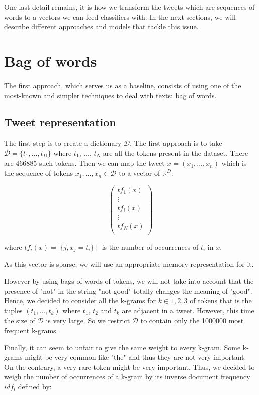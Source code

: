 \documentclass[10pt,conference,compsocconf]{IEEEtran}
\begin{document}
One last detail remains, it is how we transform the tweets which are sequences of words to a vectors we can feed classifiers with. In the next sections, we will describe different approaches and models that tackle this issue.

\section{Bag of words}

The first approach, which serves us as a baseline, consists of using one of the most-known and simpler techniques to deal with texts: bag of words.

\subsection{Tweet representation}

The first step is to create a dictionary $\mathcal{D}$. The first approach is to take $\mathcal{D} = \{ t_1, ..., t_D \}$ where $t_1$, ..., $t_N$ are all the tokens present in the dataset. There are 466885 such tokens. Then we can map the tweet $x = (x_1, ..., x_n)$ which is the sequence of tokens $x_1, ..., x_n \in \mathcal{D}$ to a vector of $\mathbb{R}^D$:

$$
\left(
\begin{array}{c}
tf_1(x) \\
\vdots \\
tf_i(x) \\
\vdots \\
tf_N(x) \\
\end{array}
\right)
$$

where $tf_i(x) = \mid \{j, x_j = t_i \} \mid$ is the number of occurrences of $t_i$ in $x$.

As this vector is sparse, we will use an appropriate memory representation for it.

However by using bags of words of tokens, we will not take into account that the presence of "not" in the string "not good" totally changes the meaning of "good". Hence, we decided to consider all the k-grams for $k \in {1, 2, 3}$ of tokens that is the tuples $(t_1, ..., t_k)$ where $t_1$, $t_2$ and $t_k$ are adjacent in a tweet. However, this time the size of $\mathcal{D}$ is very large. So we restrict $\mathcal{D}$ to contain only the 1000000 most frequent k-grams.

Finally, it can seem to unfair to give the same weight to every k-gram. Some k-grams might be very common like "the" and thus they are not very important. On the contrary, a very rare token might be very important. Thus, we decided to weigh the number of occurrences of a k-gram by its inverse document frequency $idf_i$ defined by:
\end{document}
